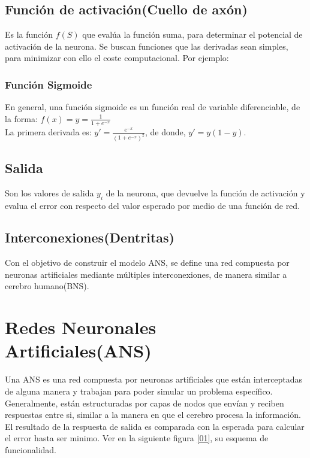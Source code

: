 \documentclass[11pt,titlepage]{report}
\begin{document}
\subsection{Función de activación(Cuello de axón)}
Es la función $f(S)$ que evalúa la función suma, para determinar el potencial de activación de la neurona. Se buscan funciones que las derivadas sean simples, para minimizar con ello el coste computacional. Por ejemplo:
\subsubsection{Función Sigmoide}
En general, una función sigmoide es un función real de variable diferenciable, de la forma: \hspace{1cm} $f(x)= y = \frac{1}{1+e^{-x}} $\\
La primera derivada es: $y' = \frac{e^{-x}}{(1+e^{-x})^{2}}$, de donde, $y' = y(1-y)$.

\subsection{Salida}
Son los valores de salida $y_i$ de la neurona, que devuelve la función de activación y evalua el error con respecto del valor esperado por medio de una función de red.

\subsection{Interconexiones(Dentritas)}
Con el objetivo de construir el modelo ANS, se define una red compuesta por neuronas artificiales mediante múltiples interconexiones, de manera similar a cerebro humano(BNS).
\section{Redes Neuronales Artificiales(ANS)} 
Una ANS es una red compuesta por neuronas artificiales que están interceptadas de alguna manera y trabajan para poder simular un problema específico. Generalmente, están estructuradas por capas de nodos que envían y reciben respuestas entre si, similar a la manera en que el cerebro procesa la información. El resultado de la respuesta de salida es comparada con la esperada para calcular el error hasta ser minimo. Ver en la siguiente figura \ref{01}, su esquema de funcionalidad. 
\end{document}
